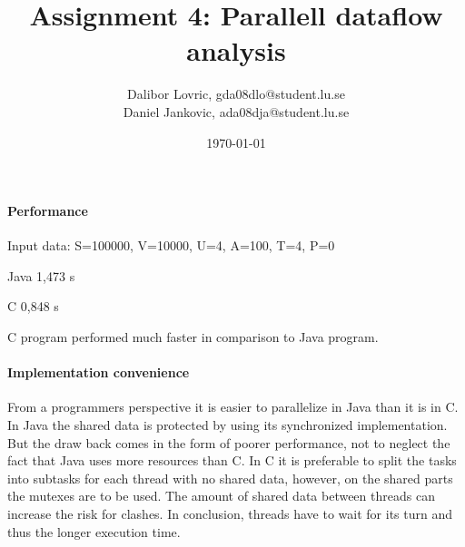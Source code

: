 \documentclass[a4paper]{article}
\title{Assignment 4: Parallell dataflow analysis}
\author{ Dalibor Lovric, gda08dlo@student.lu.se \\
 Daniel Jankovic, ada08dja@student.lu.se }
\date{\today}
\begin{document}
\maketitle
\paragraph{Performance}

Input data: S=100000, V=10000, U=4, A=100, T=4, P=0

Java   1,473 s

C 		0,848 s

C program performed much faster in comparison to Java program.
\paragraph{Implementation convenience }
From a programmers perspective it is easier to parallelize in Java than it is in C. In Java the shared data is protected by using its synchronized implementation. But the draw back comes in the form of poorer performance, not to neglect the fact that Java uses more resources than C. 
In C  it is preferable to split the tasks into subtasks for each thread with no shared data, however,  on the shared parts the mutexes are to be used. The amount of shared data between threads can increase the risk for clashes. In conclusion, threads have to wait for its turn and thus the longer execution time.
\end{document}
